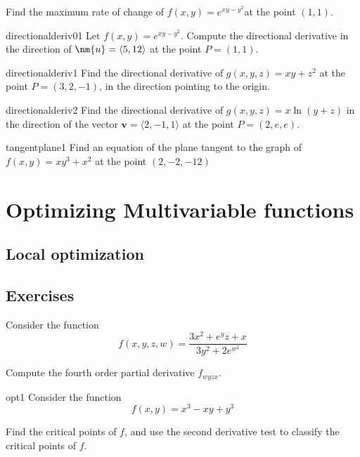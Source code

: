 \begin{problem}
    Find the maximum rate of change of $f(x,y) = e^{xy-y^2}$at the point $(1,1)$.
\end{problem}

\begin{problem}{directionalderiv01}
    Let $f(x,y) = e^{xy-y^2}$. Compute the directional derivative in the direction of $\nm{u} = \langle 5, 12 \rangle$ at the point $P = (1,1)$.
\end{problem}

\begin{problem}{directionalderiv1}
    Find the directional derivative of $g(x,y,z) = xy+z^2$ at the point $P = (3,2,-1)$, in the direction pointing to the origin.
\end{problem}

\begin{problem}{directionalderiv2}
    Find the directional derivative of $g(x,y,z) = x\ln(y+z)$ in the direction of the vector $\bm{v} = \langle 2, -1, 1 \rangle$ at the point $P = (2,e,e)$.
\end{problem}


\begin{problem}{tangentplane1}
    Find an equation of the plane tangent to the graph of $f(x,y) = xy^3 + x^2$ at the point $(2,-2,-12)$
\end{problem}

\section{Optimizing Multivariable functions}

\subsection{Local optimization}

\subsection{Exercises}

\begin{problem}
    Consider the function $$f(x,y,z,w) = \frac{3x^2 + e^yz + x}{3y^2+2e^{w^2}}$$ 

Compute the fourth order partial derivative $f_{wyzx}$.
\end{problem}

\begin{problem}{opt1}
    Consider the function $$f(x,y) = x^3 - xy +  y^3 $$
    
    Find the critical points of $f$, and use the second derivative test to classify the critical points of $f$.
\end{problem}

